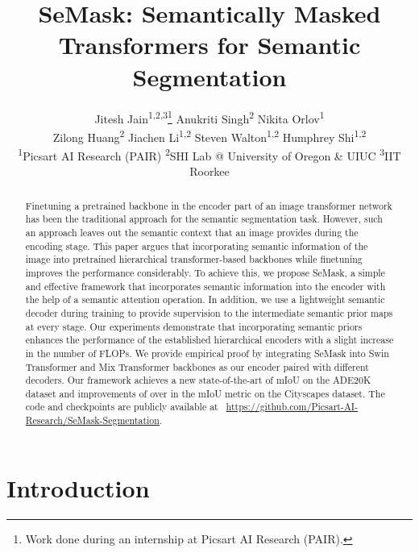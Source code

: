 \documentclass[10pt,twocolumn,letterpaper]{article}
\begin{document}
\title{SeMask: Semantically Masked Transformers for Semantic Segmentation}



\author{Jitesh Jain\textsuperscript{1,2,3}\thanks{Work done during an internship at Picsart AI Research (PAIR).} \quad Anukriti Singh\textsuperscript{2} \quad Nikita Orlov\textsuperscript{1} \\ \quad Zilong Huang\textsuperscript{2} \quad Jiachen Li\textsuperscript{1,2} \quad Steven Walton\textsuperscript{1,2} \quad Humphrey Shi\textsuperscript{1,2}\\
{\small \textsuperscript{1}Picsart AI Research (PAIR) \qquad \textsuperscript{2}SHI Lab @ University of Oregon \& UIUC \qquad \textsuperscript{3}IIT Roorkee}}

\maketitle

\begin{abstract}

Finetuning a pretrained backbone in the encoder part of an image transformer network has been the traditional approach for the semantic segmentation task. However, such an approach leaves out the semantic context that an image provides during the encoding stage. This paper argues that incorporating semantic information of the image into pretrained hierarchical transformer-based backbones while finetuning improves the performance considerably. To achieve this, we propose SeMask, a simple and effective framework that incorporates semantic information into the encoder with the help of a semantic attention operation. In addition, we use a lightweight semantic decoder during training to provide supervision to the intermediate semantic prior maps at every stage. Our experiments demonstrate that incorporating semantic priors enhances the performance of the established hierarchical encoders with a slight increase in the number of FLOPs. We provide empirical proof by integrating SeMask into Swin Transformer and Mix Transformer backbones as our encoder paired with different decoders. Our framework achieves a new state-of-the-art of  mIoU on the ADE20K dataset and improvements of over  in the mIoU metric on the Cityscapes dataset.  The code and checkpoints are publicly available at~
\href{https://github.com/Picsart-AI-Research/SeMask-Segmentation}{https://github.com/Picsart-AI-Research/SeMask-Segmentation}.
\end{abstract} \section{Introduction}
\end{document}
